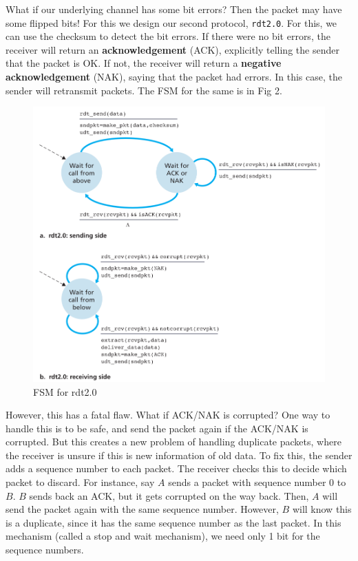 \documentclass[12pt,letterpaper]{amsbook}
\theoremstyle{definition}
\begin{document}
What if our underlying channel has some bit errors? Then the packet may have some flipped bits! For this we design our second protocol, \texttt{rdt2.0}. For this, we can use the checksum to detect the bit errors. If there were no bit errors, the receiver will return an \textbf{acknowledgement} (ACK), explicitly telling the sender that the packet is OK. If not, the receiver will return a \textbf{negative acknowledgement} (NAK), saying that the packet had errors. In this case, the sender will retransmit packets. The FSM for the same is in Fig 2.

\begin{figure}[htpb]
  \centering
  \includegraphics[width=0.8\linewidth]{./assets/rdt2_fsm.png}
  \caption{FSM for rdt2.0}%
  \label{fig:}
\end{figure}

However, this has a fatal flaw. What if ACK/NAK is corrupted? One way to handle this is to be safe, and send the packet again if the ACK/NAK is corrupted. But this creates a new problem of handling duplicate packets, where the receiver is unsure if this is new information of old data. To fix this, the sender adds a sequence number to each packet. The receiver checks this to decide which packet to discard.  For instance, say $A$ sends a packet with sequence number 0 to $B$. $B$ sends back an ACK, but it gets corrupted on the way back. Then, $A$ will send the packet again with the same sequence number. However, $B$ will know this is a duplicate, since it has the same sequence number as the last packet. In this mechanism (called a stop and wait mechanism), we need only 1 bit for the sequence numbers.
\end{document}
